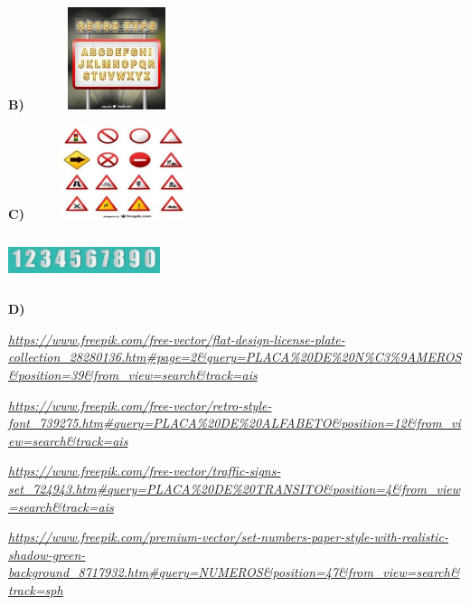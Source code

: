 \begin{escola}
\textbf{B)}
\includegraphics[width=2.03125in,height=1.17361in]{media/image223.jpg}

\textbf{C)}
\includegraphics[width=2.20764in,height=1.07569in]{media/image224.jpg}

\includegraphics[width=1.75000in,height=0.54792in]{media/image225.jpg}

\textbf{D)}

\href{https://www.freepik.com/free-vector/flat-design-license-plate-collection_28280136.htm\#page=2\&query=PLACA\%20DE\%20N\%C3\%9AMEROS\&position=39\&from_view=search\&track=ais}{\emph{https://www.freepik.com/free-vector/flat-design-license-plate-collection\_28280136.htm\#page=2\&query=PLACA\%20DE\%20N\%C3\%9AMEROS\&position=39\&from\_view=search\&track=ais}}

\href{https://www.freepik.com/free-vector/retro-style-font_739275.htm\#query=PLACA\%20DE\%20ALFABETO\&position=12\&from_view=search\&track=ais}{\emph{https://www.freepik.com/free-vector/retro-style-font\_739275.htm\#query=PLACA\%20DE\%20ALFABETO\&position=12\&from\_view=search\&track=ais}}

\href{https://www.freepik.com/free-vector/traffic-signs-set_724943.htm\#query=PLACA\%20DE\%20TRANSITO\&position=4\&from_view=search\&track=ais}{\emph{https://www.freepik.com/free-vector/traffic-signs-set\_724943.htm\#query=PLACA\%20DE\%20TRANSITO\&position=4\&from\_view=search\&track=ais}}

\href{https://www.freepik.com/premium-vector/set-numbers-paper-style-with-realistic-shadow-green-background_8717932.htm\#query=NUMEROS\&position=47\&from_view=search\&track=sph}{\emph{https://www.freepik.com/premium-vector/set-numbers-paper-style-with-realistic-shadow-green-background\_8717932.htm\#query=NUMEROS\&position=47\&from\_view=search\&track=sph}}


\end{escola}
